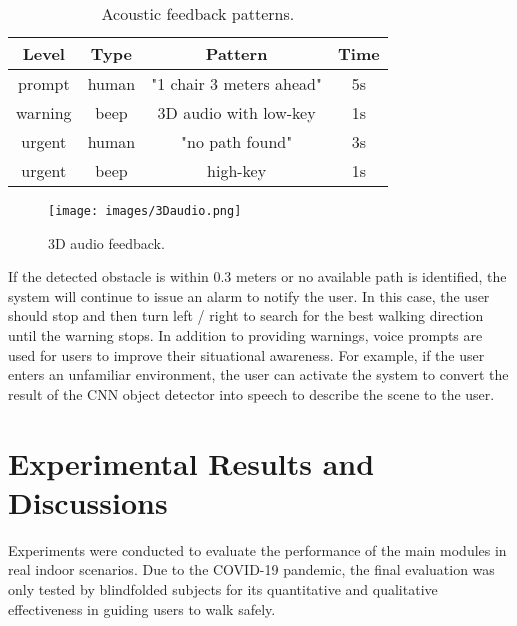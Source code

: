 \documentclass{ieeeaccess}
\begin{document}
\begin{table}[t]
\centering
\caption{Acoustic feedback patterns.}
\label{tab:acoustic pattern}
\begin{tabular}{|c|c|c|c|}
\hline
Level   & Type  & Pattern                & Time \\ \hline
prompt  & human & "1 chair 3 meters ahead" & 5s   \\ \hline
warning & beep  & 3D audio with low-key             & 1s   \\ \hline
urgent  & human & "no path found"          & 3s   \\ \hline
urgent  & beep  & high-key              & 1s   \\ \hline
\end{tabular}
\end{table} 

\begin{figure}
    \centering
    \texttt{[image: images/3Daudio.png]}
    \caption{3D audio feedback.}
    \label{fig:3Daudio}
\end{figure}
If the detected obstacle is within 0.3 meters or no available path is identified, the system will continue to issue an alarm to notify the user. In this case, the user should stop and then turn left / right to search for the best walking direction until the warning stops. In addition to providing warnings, voice prompts are used for users to improve their situational awareness. For example, if the user enters an unfamiliar environment, the user can activate the system to convert the result of the CNN object detector into speech to describe the scene to the user.



\section{Experimental Results and Discussions} \label{section:experiment}

 Experiments were conducted to evaluate the performance of the main modules in real indoor scenarios. Due to the COVID-19 pandemic, the final evaluation was only tested by blindfolded subjects for its quantitative and qualitative effectiveness in guiding users to walk safely. 


 
\end{document}
